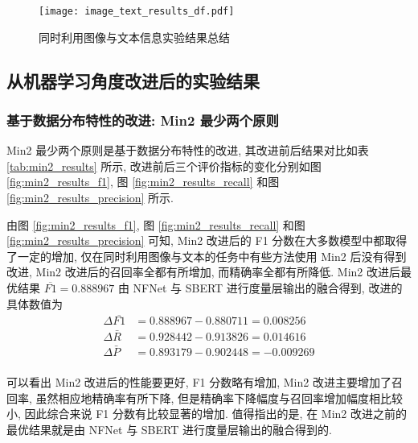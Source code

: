 \documentclass[12pt]{article}
\begin{document}
\begin{figure}[htbp]
  \centering
  \texttt{[image: image\_text\_results\_df.pdf]}
  \caption{同时利用图像与文本信息实验结果总结}
  \label{fig:image_text_results}
\end{figure}

\subsection{从机器学习角度改进后的实验结果}

\subsubsection{基于数据分布特性的改进: Min2 最少两个原则}

Min2 最少两个原则是基于数据分布特性的改进, 其改进前后结果对比如表 \ref{tab:min2_results} 所示, 改进前后三个评价指标的变化分别如图 \ref{fig:min2_results_f1}, 图 \ref{fig:min2_results_recall} 和图 \ref{fig:min2_results_precision} 所示.

由图 \ref{fig:min2_results_f1}, 图 \ref{fig:min2_results_recall} 和图 \ref{fig:min2_results_precision} 可知, Min2 改进后的 F1 分数在大多数模型中都取得了一定的增加, 仅在同时利用图像与文本的任务中有些方法使用 Min2 后没有得到改进, Min2 改进后的召回率全都有所增加, 而精确率全都有所降低. Min2 改进后最优结果 $\overline{F1}=0.888967$ 由 NFNet 与 SBERT 进行度量层输出的融合得到, 改进的具体数值为
\begin{equation}
  \begin{aligned}
    \Delta\overline{F1}&=0.888967-0.880711=0.008256\\
    \Delta\bar{R}&=0.928442-0.913826=0.014616\\
    \Delta\bar{P}&=0.893179-0.902448=-0.009269\\
  \end{aligned}
\end{equation}

可以看出 Min2 改进后的性能要更好, F1 分数略有增加, Min2 改进主要增加了召回率, 虽然相应地精确率有所下降, 但是精确率下降幅度与召回率增加幅度相比较小, 因此综合来说 F1 分数有比较显著的增加. 值得指出的是, 在 Min2 改进之前的最优结果就是由 NFNet 与 SBERT 进行度量层输出的融合得到的.
\end{document}
